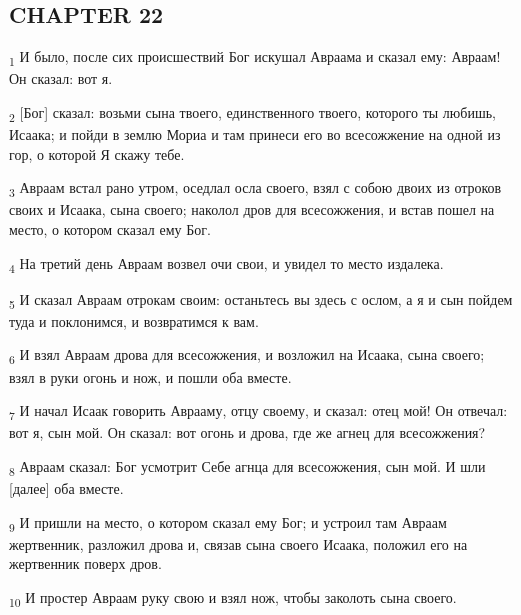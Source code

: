 \subsection{CHAPTER 22}
\begin{tcolorbox}
\textsubscript{1} И было, после сих происшествий Бог искушал Авраама и сказал ему: Авраам! Он сказал: вот я.
\end{tcolorbox}
\begin{tcolorbox}
\textsubscript{2} [Бог] сказал: возьми сына твоего, единственного твоего, которого ты любишь, Исаака; и пойди в землю Мориа и там принеси его во всесожжение на одной из гор, о которой Я скажу тебе.
\end{tcolorbox}
\begin{tcolorbox}
\textsubscript{3} Авраам встал рано утром, оседлал осла своего, взял с собою двоих из отроков своих и Исаака, сына своего; наколол дров для всесожжения, и встав пошел на место, о котором сказал ему Бог.
\end{tcolorbox}
\begin{tcolorbox}
\textsubscript{4} На третий день Авраам возвел очи свои, и увидел то место издалека.
\end{tcolorbox}
\begin{tcolorbox}
\textsubscript{5} И сказал Авраам отрокам своим: останьтесь вы здесь с ослом, а я и сын пойдем туда и поклонимся, и возвратимся к вам.
\end{tcolorbox}
\begin{tcolorbox}
\textsubscript{6} И взял Авраам дрова для всесожжения, и возложил на Исаака, сына своего; взял в руки огонь и нож, и пошли оба вместе.
\end{tcolorbox}
\begin{tcolorbox}
\textsubscript{7} И начал Исаак говорить Аврааму, отцу своему, и сказал: отец мой! Он отвечал: вот я, сын мой. Он сказал: вот огонь и дрова, где же агнец для всесожжения?
\end{tcolorbox}
\begin{tcolorbox}
\textsubscript{8} Авраам сказал: Бог усмотрит Себе агнца для всесожжения, сын мой. И шли [далее] оба вместе.
\end{tcolorbox}
\begin{tcolorbox}
\textsubscript{9} И пришли на место, о котором сказал ему Бог; и устроил там Авраам жертвенник, разложил дрова и, связав сына своего Исаака, положил его на жертвенник поверх дров.
\end{tcolorbox}
\begin{tcolorbox}
\textsubscript{10} И простер Авраам руку свою и взял нож, чтобы заколоть сына своего.
\end{tcolorbox}
